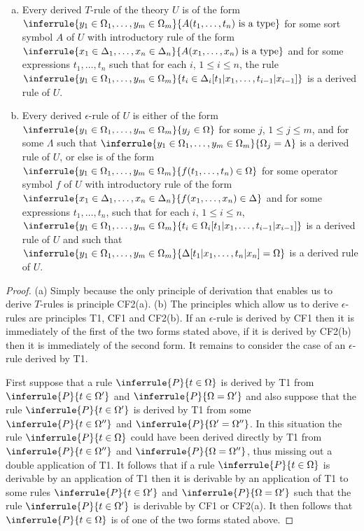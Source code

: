 \begin{lemma}

\begin{enumerate}[(a)]
\item Every derived $T$-rule of the theory $U$ is of the form $\inferrule{y_1\in\Omega_1,\ldots,y_m\in\Omega_m}{A(t_1,\ldots,t_n)\isatype}$ for some sort symbol $A$ of $U$ with introductory rule of the form $\inferrule{x_1\in\Delta_1,\ldots,x_n\in\Delta_n}{A(x_1,\ldots,x_n)\isatype}$ and for some expressions $t_1,\ldots,t_n$ such that for each $i$, $1\leq i\leq n$, the rule $\inferrule{y_1\in\Omega_1,\ldots,y_m\in\Omega_m}{t_i\in\Delta_i[t_1|x_1,\ldots,t_{i-1}|x_{i-1}]}$ is a derived rule of $U$.
\item Every derived $\epsilon$-rule of $U$ is either of the form $\inferrule{y_1\in\Omega_1,\ldots,y_m\in\Omega_m}{y_j\in\Omega}$ for some $j$, $1\leq j\leq m$, and for some $\Lambda$ such that $\inferrule{y_1\in\Omega_1,\ldots,y_m\in\Omega_m}{\Omega_j=\Lambda}$ is a derived rule of $U$, or else is of the form $\inferrule{y_1\in\Omega_1,\ldots,y_m\in\Omega_m}{f(t_1,\ldots,t_n)\in\Omega}$ for some operator symbol $f$ of $U$ with introductory rule of the form $\inferrule{x_1\in\Delta_1,\ldots,x_n\in\Delta_n}{f(x_1,\ldots,x_n)\in\Delta}$ and for some expressions $t_1,\ldots,t_n$, such that for each $i$, $1\leq i\leq n$, $\inferrule{y_1\in\Omega_1,\ldots,y_m\in\Omega_m}{t_i\in\Omega_i[t_1|x_1,\ldots,t_{i-1}|x_{i-1}]}$ is a derived rule of $U$ and such that $\inferrule{y_1\in\Omega_1,\ldots,y_m\in\Omega_m}{\Delta[t_1|x_1,\ldots,t_n|x_n]=\Omega}$ is a derived rule of $U$.
\end{enumerate}
\end{lemma}
\begin{proof}
  (a) Simply because the only principle of derivation that enables us to derive $T$-rules is principle CF2(a).
  (b) The principles which allow us to derive $\epsilon$-rules are principles T1, CF1 and CF2(b).
  If an $\epsilon$-rule is derived by CF1 then it is immediately of the first of the two forms stated above, if it is derived by CF2(b) then it is immediately of the second form.
  It remains to consider the case of an $\epsilon$-rule derived by T1.


  First suppose that a rule $\inferrule{P}{t\in\Omega}$ is derived by T1 from $\inferrule{P}{t\in\Omega'}$ and $\inferrule{P}{\Omega=\Omega'}$ and also suppose that the rule $\inferrule{P}{t\in\Omega'}$ is derived by T1 from some $\inferrule{P}{t\in\Omega''}$ and $\inferrule{P}{\Omega'=\Omega''}$.
  In this situation the rule $\inferrule{P}{t\in\Omega}$ could have been derived directly by T1 from $\inferrule{P}{t\in\Omega''}$ and $\inferrule{P}{\Omega=\Omega''}$, thus missing out a double application of T1.
  It follows that if a rule $\inferrule{P}{t\in\Omega}$ is derivable by an application of T1 then it is derivable by an application of T1 to some rules $\inferrule{P}{t\in\Omega'}$ and $\inferrule{P}{\Omega=\Omega'}$ such that the rule $\inferrule{P}{t\in\Omega'}$ is derivable by CF1 or CF2(a).
  It then follows that $\inferrule{P}{t\in\Omega}$ is of one of the two forms stated above.
\end{proof}

